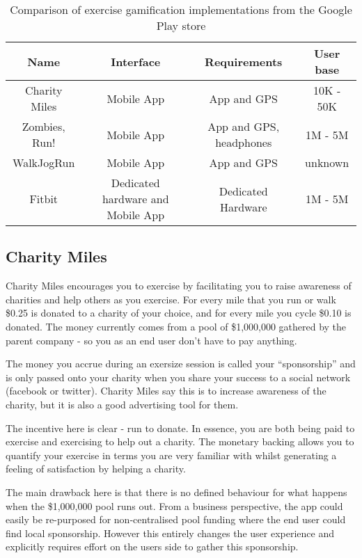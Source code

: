 \begin{table}[h]
  \centering
  \begin{tabular}{ | c | c | c | c |} \hline
    Name & Interface & Requirements & User base  \\ \hline
    Charity Miles & Mobile App & App and GPS & 10K - 50K\\ \hline
    Zombies, Run! & Mobile App & App and GPS, headphones & 1M - 5M\\ \hline
    WalkJogRun & Mobile App & App and GPS  & unknown \\ \hline
    Fitbit & Dedicated hardware and Mobile App & Dedicated Hardware & 1M - 5M\\ \hline
  \end{tabular}
  \caption{Comparison of exercise gamification implementations from
    the Google Play store}
  \label{table:competitor_comparison}
\end{table}

\subsection{Charity Miles}
Charity Miles encourages you to exercise by facilitating you to raise
awareness of charities and help
others as you exercise. For every mile that you run or walk \$0.25 is
donated to a charity of your choice, and for every mile you cycle \$0.10
is donated. The money currently comes from a pool of \$1,000,000
gathered by the parent company - so you as an end user don't have to pay
anything. 

The money you accrue during an exersize session is called your
``sponsorship'' and is only passed onto your charity when you share
your success to a social network (facebook or
twitter)\cite{charitymiles_terms}. Charity Miles say this is to
increase awareness of the charity, but it is also a good advertising
tool for them.

The incentive here is clear - run to donate. In essence, you are both
being paid to exercise and exercising to help out a charity. The
monetary backing allows you to quantify your exercise in terms you are
very familiar with whilst generating a feeling of satisfaction by
helping a charity.

The main drawback here is that there is no defined behaviour for what
happens when the \$1,000,000 pool runs out. From a business
perspective, the app could easily be re-purposed for non-centralised
pool funding where the end user could find local sponsorship. However
this entirely changes the user experience and explicitly requires
effort on the users side to gather this sponsorship. 

